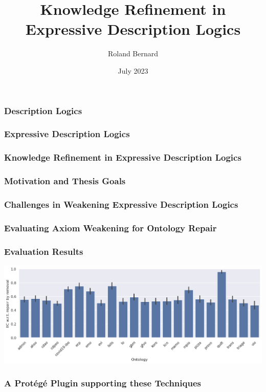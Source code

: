 \documentclass[aspectratio=169]{beamer}
\title{Knowledge Refinement in\\Expressive Description Logics}
\author{Roland Bernard}
\date{July 2023}
\begin{document}
\frame{\titlepage}

\begin{frame}
\frametitle{Description Logics}


\end{frame}

\begin{frame}
\frametitle{Expressive \textnormal{Description Logics}}


\end{frame}

\begin{frame}
\frametitle{Knowledge Refinement \textnormal{in Expressive Description Logics}}


\end{frame}

\begin{frame}
\frametitle{Motivation and Thesis Goals}


\end{frame}

\begin{frame}
\frametitle{Challenges in Weakening Expressive Description Logics}


\end{frame}

\begin{frame}
  \frametitle{Evaluating Axiom Weakening for Ontology Repair}

\end{frame}

\begin{frame}
  \frametitle{Evaluation Results}

  \includegraphics[width=\textwidth]{resources/iic-remove-ontology-bar.png}
\end{frame}

\begin{frame}
  \frametitle{A Protégé Plugin supporting these Techniques}
  
  
\end{frame}
\end{document}
